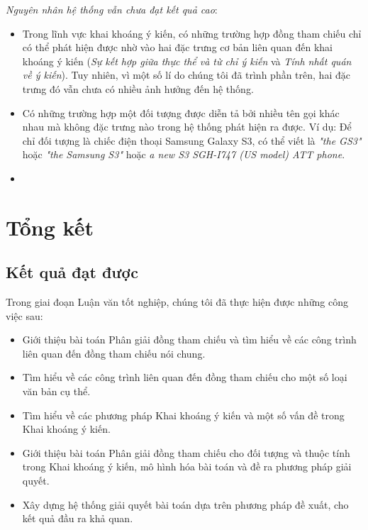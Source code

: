 \documentclass[12pt]{report}
\begin{document}
			\par \textit{Nguyên nhân hệ thống vẫn chưa đạt kết quả cao}:
				\begin{itemize}
					\item{Trong lĩnh vực khai khoáng ý kiến, có những trường hợp đồng tham chiếu chỉ có thể phát hiện được nhờ vào hai đặc trưng cơ bản liên quan đến khai khoáng ý kiến (\textit{Sự kết hợp giữa thực thể và từ chỉ ý kiến} và \textit{Tính nhất quán về ý kiến}). Tuy nhiên, vì một số lí do chúng tôi đã trình phần trên, hai đặc trưng đó vẫn chưa có nhiều ảnh hưởng đến hệ thống}.
					\item{Có những trường hợp một đối tượng được diễn tả bởi nhiều tên gọi khác nhau mà không đặc trưng nào trong hệ thống phát hiện ra được. Ví dụ: Để chỉ đối tượng là chiếc điện thoại Samsung Galaxy S3, có thể viết là \textit{"the GS3"} hoặc \textit{"the Samsung S3"} hoặc \textit{a new S3 SGH-I747 (US model) ATT phone}}.
					\item{}
				\end{itemize}

		
	\chapter{Tổng kết}	
		\section*{Kết quả đạt được}		
		\par Trong giai đoạn Luận văn tốt nghiệp, chúng tôi đã thực hiện được những công việc sau:
		\begin{itemize}
			\item{Giới thiệu bài toán Phân giải đồng tham chiếu và tìm hiểu về các công trình liên quan đến đồng tham chiếu nói chung.}
			\item{Tìm hiểu về các công trình liên quan đến đồng tham chiếu cho một số loại văn bản cụ thể.}
			\item{Tìm hiểu về các phương pháp Khai khoáng ý kiến và một số vấn đề trong Khai khoáng ý kiến.}
			\item{Giới thiệu bài toán Phân giải đồng tham chiếu cho đối tượng và thuộc tính trong Khai khoáng ý kiến, mô hình hóa bài toán và đề ra phương pháp giải quyết.}
			\item{Xây dựng hệ thống giải quyết bài toán dựa trên phương pháp đề xuất, cho kết quả đầu ra khả quan.}
		\end{itemize}
\end{document}
